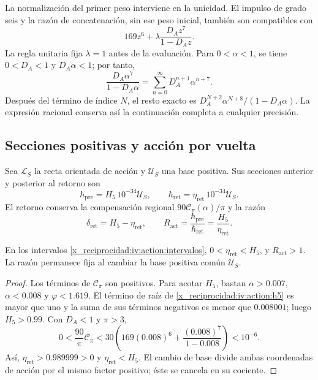 La normalización del primer peso interviene en la unicidad.
El impulso de grado seis y la razón de concatenación, sin ese
peso inicial, también son compatibles con
\[
 169z^6+\lambda\frac{D_Az^7}{1-D_Az}.
\]
La regla unitaria fija \(\lambda=1\) antes de la evaluación.
Para \(0<\alpha<1\), se tiene \(0<D_A<1\) y \(D_A\alpha<1\);
por tanto,
\begin{equation}
 \frac{D_A\alpha^7}{1-D_A\alpha}
   =\sum_{n=0}^{\infty}D_A^{n+1}\alpha^{n+7}.
 \label{x_reciprocidad:iv:action:cola}
\end{equation}
Después del término de índice \(N\), el resto exacto es
\(D_A^{N+2}\alpha^{N+8}/(1-D_A\alpha)\). La expresión racional
conserva así la continuación completa a cualquier precisión.

\subsection{Secciones positivas y acción por vuelta}
\label{x_reciprocidad:iv:action:secciones}

Sea \(\mathcal L_S\) la recta orientada de acción y
\(\mathcal U_S\) una base positiva. Sus secciones anterior y
posterior al retorno son
\begin{equation}
 \hbar_{\mathrm{pre}}=H_5\,10^{-34}\mathcal U_S,\qquad
 \hbar_{\mathrm{ret}}=\eta_{\mathrm{ret}}\,10^{-34}\mathcal U_S.
 \label{x_reciprocidad:iv:action:hbar}
\end{equation}
El retorno conserva la compensación regional
\(90\mathcal C_\pi(\alpha)/\pi\) y la razón
\begin{equation}
 \delta_{\mathrm{ret}}=H_5-\eta_{\mathrm{ret}},\qquad
 R_{\mathrm{act}}=\frac{\hbar_{\mathrm{pre}}}
                        {\hbar_{\mathrm{ret}}}
                =\frac{H_5}{\eta_{\mathrm{ret}}}.
 \label{x_reciprocidad:iv:action:razon}
\end{equation}

\begin{proposition}
\label{x_reciprocidad:iv:action:positividad}
En los intervalos \eqref{x_reciprocidad:iv:action:intervalos},
\(0<\eta_{\mathrm{ret}}<H_5\), y \(R_{\mathrm{act}}>1\).
La razón permanece fija al cambiar la base positiva común
\(\mathcal U_S\).
\end{proposition}
\begin{proof}
Los términos de \(\mathcal C_\pi\) son positivos. Para acotar
\(H_5\), bastan \(\alpha>0.007\), \(\alpha<0.008\) y
\(\varphi<1.619\). El término de raíz de \eqref{x_reciprocidad:iv:action:h5}
es mayor que uno y la suma de sus términos negativos es menor
que \(0.008001\); luego \(H_5>0.99\).
Con \(D_A<1\) y \(\pi>3\),
\[
 0<\frac{90}{\pi}\mathcal C_\pi
 <30\left(169(0.008)^6+
             \frac{(0.008)^7}{1-0.008}\right)<10^{-6}.
\]
Así, \(\eta_{\mathrm{ret}}>0.989999>0\) y
\(\eta_{\mathrm{ret}}<H_5\). El cambio de base divide ambas
coordenadas de acción por el mismo factor positivo; éste se
cancela en su cociente.
\end{proof}

